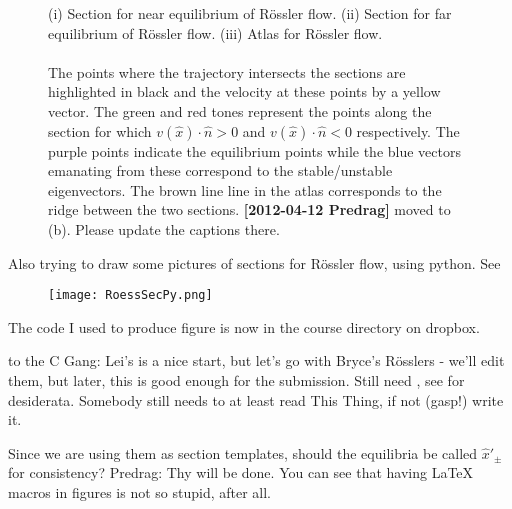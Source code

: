 \begin{description}
 \begin{figure}[H]
 \begin{center}
 \end{center}
 \caption{\label{fig:roesslerSections}(i) Section for near equilibrium of
 R\"ossler flow. (ii) Section for far equilibrium of R\"ossler flow.
 (iii) Atlas for R\"ossler flow. \\ \\The points where the trajectory
 intersects the sections are highlighted in black and the velocity at
 these points by a yellow vector. The green and red tones represent the
 points along the section for which $v(\hat{x})\cdot\hat{n}>0$ and
 $v(\hat{x})\cdot\hat{n}<0$ respectively. The purple points indicate the
 equilibrium points while the blue vectors emanating from these
 correspond to the stable/unstable eigenvectors. The brown line line in
 the atlas corresponds to the ridge between the two sections.
 {\bf [2012-04-12 Predrag]} moved to \,(b). Please update the
 captions there.
 }
 \end{figure}

 \item[2012-04-12 Lei] Also trying to draw some pictures of sections for
 R\"ossler flow, using python. See 
 \begin{figure}[H]
 \begin{center}
 \texttt{[image: RoessSecPy.png]}
 \end{center}
 \caption{\label{fig:RoessSecPy}}
 \end{figure}

\item[2012-04-12 Bryce] The code I used to produce figure
 is now in the course directory on dropbox.

\item[2012-04-12 Predrag] to the C Gang: Lei's is a nice start, but let's
go with Bryce's R\"osslers - we'll edit them, but later, this is good
enough for the submission. Still need , see
 for desiderata. Somebody still needs to at least read
This Thing, if not (gasp!) write it.

\item[2012-04-12 Daniel]
    Since we are using them as section templates, should the equilibria
    be called $\hat{x}'_{\pm}$ for consistency? Predrag: Thy will be
    done. You can see that having LaTeX macros in figures is not so
    stupid, after all.


\end{description}
